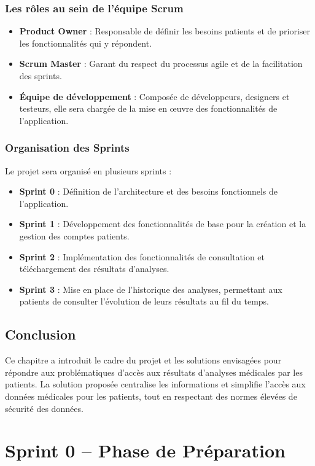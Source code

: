 \documentclass[12pt,a4paper]{report}
\begin{document}
\subsection{Les rôles au sein de l'équipe Scrum}
\begin{itemize}
    \item \textbf{Product Owner} : Responsable de définir les besoins patients et de prioriser les fonctionnalités qui y répondent.
    \item \textbf{Scrum Master} : Garant du respect du processus agile et de la facilitation des sprints.
    \item \textbf{Équipe de développement} : Composée de développeurs, designers et testeurs, elle sera chargée de la mise en œuvre des fonctionnalités de l'application.
\end{itemize}

\subsection{Organisation des Sprints}
Le projet sera organisé en plusieurs sprints :

\begin{itemize}
    \item \textbf{Sprint 0} : Définition de l'architecture et des besoins fonctionnels de l'application.
    \item \textbf{Sprint 1} : Développement des fonctionnalités de base pour la création et la gestion des comptes patients.
    \item \textbf{Sprint 2} : Implémentation des fonctionnalités de consultation et téléchargement des résultats d'analyses.
    \item \textbf{Sprint 3} : Mise en place de l'historique des analyses, permettant aux patients de consulter l'évolution de leurs résultats au fil du temps.
\end{itemize}

\section{Conclusion}
Ce chapitre a introduit le cadre du projet et les solutions envisagées pour répondre aux problématiques d'accès aux résultats d'analyses médicales par les patients. La solution proposée centralise les informations et simplifie l'accès aux données médicales pour les patients, tout en respectant des normes élevées de sécurité des données.


\chapter{Sprint 0 – Phase de Préparation}
\end{document}
